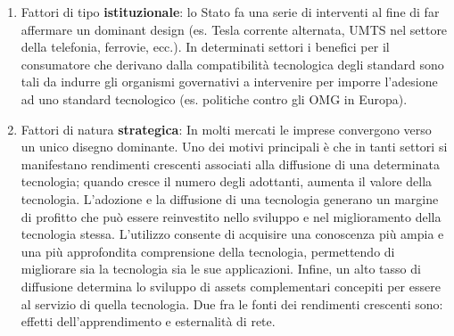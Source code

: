 \documentclass{article}
\begin{document}
\begin{enumerate}
	\item Fattori di tipo \textbf{istituzionale}: lo Stato fa una serie di interventi al fine di far affermare un
	dominant design (es. Tesla corrente alternata, UMTS nel settore della telefonia, ferrovie,
	ecc.).
	In determinati settori i benefici per il consumatore che derivano dalla compatibilità
	tecnologica degli standard sono tali da indurre gli organismi governativi a intervenire per
	imporre l’adesione ad uno standard tecnologico (es. politiche contro gli OMG in Europa).
	\item Fattori di natura \textbf{strategica}: In molti mercati le imprese convergono verso un unico disegno dominante. Uno dei motivi
	principali è che in tanti settori si manifestano rendimenti crescenti associati alla diffusione
	di una determinata tecnologia; quando cresce il numero degli adottanti, aumenta il valore
	della tecnologia.
	L’adozione e la diffusione di una tecnologia generano un margine di profitto che può essere
	reinvestito nello sviluppo e nel miglioramento della tecnologia stessa. L’utilizzo consente di
	acquisire una conoscenza più ampia e una più approfondita comprensione della tecnologia,
	permettendo di migliorare sia la tecnologia sia le sue applicazioni. Infine, un alto tasso di
	diffusione determina lo sviluppo di assets complementari concepiti per essere al servizio di
	quella tecnologia. Due fra le fonti dei rendimenti crescenti sono: effetti dell’apprendimento e
	esternalità di rete.
	

\end{enumerate}
\end{document}

